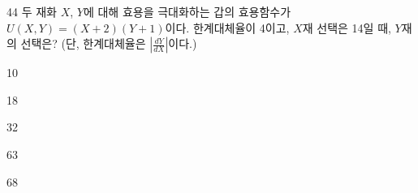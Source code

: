 \begin{question}{44}
두 재화 $X$, $Y$에 대해 효용을 극대화하는 갑의 효용함수가 $U(X,Y)=(X+2)(Y+1)$이다. 한계대체율이 4이고, $X$재 선택은 14일 때, $Y$재의 선택은? (단, 한계대체율은 $\left|\frac{dY}{dX}\right|$이다.)
\begin{choices}
  \item 10
  \item 18
  \item 32
  \item 63
  \item 68
\end{choices}
\end{question}
